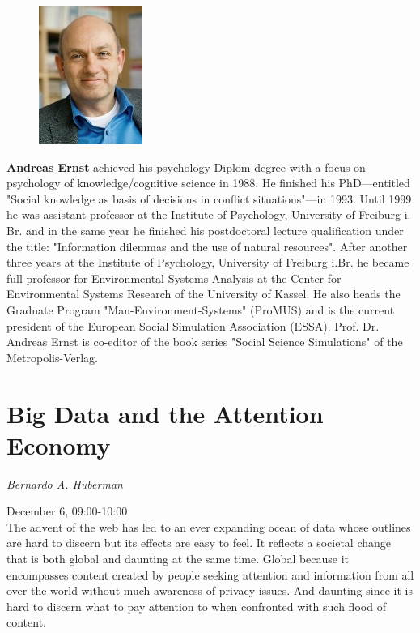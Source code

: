 \begin{figure}
  \includegraphics{andreas_ernst}
\end{figure}
\noindent\textbf{Andreas Ernst} achieved his psychology Diplom
degree with a focus on psychology of knowledge/cognitive science in 1988. He
finished his PhD—entitled "Social knowledge as basis of decisions in conflict
situations"—in 1993. Until 1999 he was assistant professor at the Institute of
Psychology, University of Freiburg i. Br. and in the same year he finished his
postdoctoral lecture qualification under the title: "Information dilemmas and
the use of natural resources". After another three years at the Institute of
Psychology, University of Freiburg i.Br. he became full professor for
Environmental Systems Analysis at the Center for Environmental Systems Research
of the University of Kassel. He also heads the Graduate Program
"Man-Environment-Systems" (ProMUS) and is the current president of the European
Social Simulation Association (ESSA). Prof. Dr. Andreas Ernst is co-editor of
the book series "Social Science Simulations" of the Metropolis-Verlag.


\section{Big Data and the Attention Economy}

\noindent \textit{Bernardo A. Huberman}

\noindent December 6, 09:00-10:00
\\

\noindent The advent of the web has led to an ever expanding ocean of data whose
outlines are hard to discern but its effects are easy to feel. It reflects a
societal change that is both global and daunting at the same time. Global
because it encompasses content created by people seeking attention and
information from all over the world without much awareness of privacy issues.
And daunting since it is hard to discern what to pay attention to when
confronted with such flood of content.

